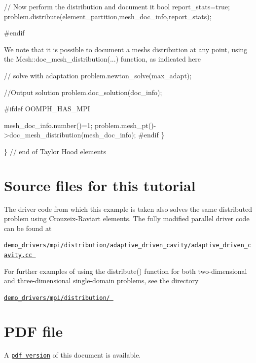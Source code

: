 \begin{DoxyCodeInclude}

    \textcolor{comment}{// Now perform the distribution and document it}
    \textcolor{keywordtype}{bool} report\_stats=\textcolor{keyword}{true};
    problem.distribute(element\_partition,mesh\_doc\_info,report\_stats);

\textcolor{preprocessor}{#endif}

\end{DoxyCodeInclude}


We note that it is possible to document a mesh\textquotesingle{}s distribution at any point, using the {\ttfamily Mesh\+::doc\+\_\+mesh\+\_\+distribution}(...) function, as indicated here


\begin{DoxyCodeInclude}

    \textcolor{comment}{// solve with adaptation}
    problem.newton\_solve(max\_adapt);

    \textcolor{comment}{//Output solution}
    problem.doc\_solution(doc\_info);

\textcolor{preprocessor}{#ifdef OOMPH\_HAS\_MPI}

    mesh\_doc\_info.number()=1;
    problem.mesh\_pt()->doc\_mesh\_distribution(mesh\_doc\_info);
\textcolor{preprocessor}{#endif}
   \}

 \} \textcolor{comment}{// end of Taylor Hood elements}

\end{DoxyCodeInclude}




 

\hypertarget{index_sources}{}\section{Source files for this tutorial}\label{index_sources}
The driver code from which this example is taken also solves the same distributed problem using Crouzeix-\/\+Raviart elements. The fully modified parallel driver code can be found at

\begin{center} \href{../../../../demo_drivers/mpi/distribution/adaptive_driven_cavity/adaptive_driven_cavity.cc}{\tt demo\+\_\+drivers/mpi/distribution/adaptive\+\_\+driven\+\_\+cavity/adaptive\+\_\+driven\+\_\+cavity.\+cc } \end{center} 

For further examples of using the {\ttfamily distribute()} function for both two-\/dimensional and three-\/dimensional single-\/domain problems, see the directory

\begin{center} \href{../../../../demo_drivers/mpi/distribution/}{\tt demo\+\_\+drivers/mpi/distribution/ } \end{center} 



 

 \hypertarget{index_pdf}{}\section{P\+D\+F file}\label{index_pdf}
A \href{../latex/refman.pdf}{\tt pdf version} of this document is available. 
